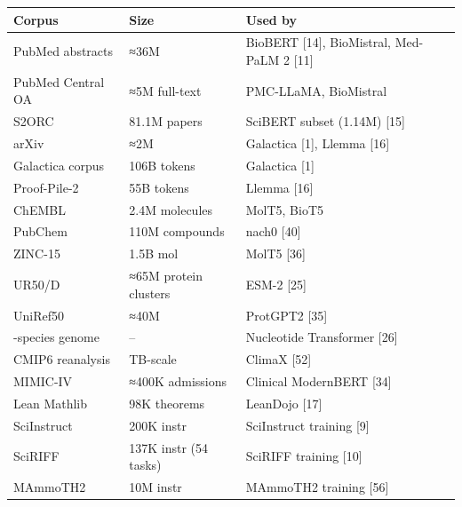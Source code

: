 {\def\LTcaptype{none} %
\begin{longtable}[]{@{}
  >{\raggedright\arraybackslash}p{}
  >{\raggedright\arraybackslash}p{}
  >{\raggedright\arraybackslash}p{}@{}}
\toprule\noalign{}
\begin{minipage}[b]{\linewidth}\raggedright
Corpus
\end{minipage} & \begin{minipage}[b]{\linewidth}\raggedright
Size
\end{minipage} & \begin{minipage}[b]{\linewidth}\raggedright
Used by
\end{minipage} \\
\midrule\noalign{}
\endhead
\bottomrule\noalign{}
\endlastfoot
PubMed abstracts & ≈36M & BioBERT {[}14{]}, BioMistral, Med-PaLM 2 {[}11{]} \\
PubMed Central OA & ≈5M full-text & PMC-LLaMA, BioMistral \\
S2ORC & 81.1M papers & SciBERT subset (1.14M) {[}15{]} \\
arXiv & ≈2M & Galactica {[}1{]}, Llemma {[}16{]} \\
Galactica corpus & 106B tokens & Galactica {[}1{]} \\
Proof-Pile-2 & 55B tokens & Llemma {[}16{]} \\
ChEMBL & 2.4M molecules & MolT5, BioT5 \\
PubChem & 110M compounds & nach0 {[}40{]} \\
ZINC-15 & 1.5B mol & MolT5 {[}36{]} \\
UR50/D & ≈65M protein clusters & ESM-2 {[}25{]} \\
UniRef50 & ≈40M & ProtGPT2 {[}35{]} \\
850-species genome & -- & Nucleotide Transformer {[}26{]} \\
CMIP6 reanalysis & TB-scale & ClimaX {[}52{]} \\
MIMIC-IV & ≈400K admissions & Clinical ModernBERT {[}34{]} \\
Lean Mathlib & 98K theorems & LeanDojo {[}17{]} \\
SciInstruct & 200K instr & SciInstruct training {[}9{]} \\
SciRIFF & 137K instr (54 tasks) & SciRIFF training {[}10{]} \\
MAmmoTH2 & 10M instr & MAmmoTH2 training {[}56{]} \\
\end{longtable}
}

